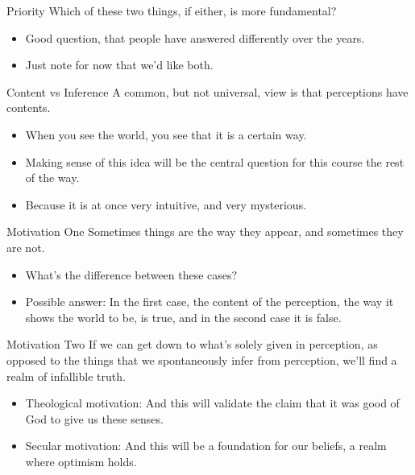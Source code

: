 \documentclass[
  17pt,
  letterpaper,
  ignorenonframetext,
  aspectratio=169,
]{beamer}
\providecommand{\tightlist}{%
  \setlength{\itemsep}{0pt}\setlength{\parskip}{0pt}}\usepackage{longtable,booktabs,array}
\begin{document}
\begin{frame}{Priority}
\protect\hypertarget{priority}{}
Which of these two things, if either, is more fundamental?

\begin{itemize}[<+->]
\tightlist
\item
  Good question, that people have answered differently over the years.
\item
  Just note for now that we'd like both.
\end{itemize}
\end{frame}

\begin{frame}{Content vs Inference}
\protect\hypertarget{content-vs-inference}{}
A common, but not universal, view is that perceptions have contents.

\begin{itemize}[<+->]
\tightlist
\item
  When you see the world, you see that it is a certain way.
\item
  Making sense of this idea will be the central question for this course
  the rest of the way.
\item
  Because it is at once very intuitive, and very mysterious.
\end{itemize}
\end{frame}

\begin{frame}{Motivation One}
\protect\hypertarget{motivation-one}{}
Sometimes things are the way they appear, and sometimes they are not.

\begin{itemize}[<+->]
\tightlist
\item
  What's the difference between these cases?
\item
  Possible answer: In the first case, the content of the perception, the
  way it shows the world to be, is true, and in the second case it is
  false.
\end{itemize}
\end{frame}

\begin{frame}{Motivation Two}
\protect\hypertarget{motivation-two}{}
If we can get down to what's solely given in perception, as opposed to
the things that we spontaneously infer from perception, we'll find a
realm of infallible truth.

\begin{itemize}[<+->]
\tightlist
\item
  Theological motivation: And this will validate the claim that it was
  good of God to give us these senses.
\item
  Secular motivation: And this will be a foundation for our beliefs, a
  realm where optimism holds.
\end{itemize}
\end{frame}
\end{document}
